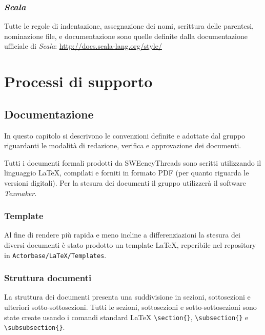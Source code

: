 \documentclass[a4paper]{article}
\begin{document}
		\subsubsection{\emph{Scala}}
		Tutte le regole di indentazione, assegnazione dei nomi, scrittura delle parentesi, nominazione file, e documentazione sono quelle
		definite dalla documentazione ufficiale di \emph{Scala}: \url{http://docs.scala-lang.org/style/}

	\newpage
	\section{Processi di supporto}
		\subsection{Documentazione}
		In questo capitolo si descrivono le convenzioni definite e adottate dal gruppo riguardanti le
		modalità di redazione, verifica e approvazione dei documenti.

		Tutti i documenti formali prodotti da SWEeneyThreads sono scritti utilizzando il linguaggio \LaTeX,
		compilati e forniti in formato PDF (per quanto riguarda le versioni digitali). Per la stesura dei
		documenti il gruppo utilizzerà il software \emph{Texmaker}.
		\subsubsection{Template}
		Al fine di rendere più rapida e meno incline a differenziazioni la stesura dei diversi documenti è stato prodotto un
		template \LaTeX, reperibile nel repository in \verb|Actorbase/LaTeX/Templates|.
		\subsubsection{Struttura documenti}
		La struttura dei documenti presenta una suddivisione in sezioni, sottosezioni e ulteriori sotto-sottosezioni.
		Tutti le sezioni, sottosezioni e sotto-sottosezioni sono state create usando i comandi standard \LaTeX \space
		\verb|\section{}|, \verb|\subsection{}| e \verb|\subsubsection{}|.
\end{document}
